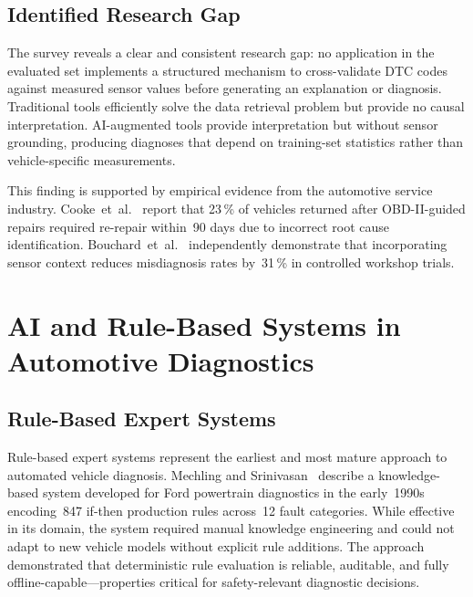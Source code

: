 \subsection{Identified Research Gap}

The survey reveals a clear and consistent research gap: no application in the evaluated set implements a structured mechanism to cross-validate DTC codes against measured sensor values before generating an explanation or diagnosis.
Traditional tools efficiently solve the data retrieval problem but provide no causal interpretation.
AI-augmented tools provide interpretation but without sensor grounding, producing diagnoses that depend on training-set statistics rather than vehicle-specific measurements.

This finding is supported by empirical evidence from the automotive service industry.
Cooke~et~al.~\cite{cooke2022} report that 23\,\% of vehicles returned after OBD-II-guided repairs required re-repair within~90 days due to incorrect root cause identification.
Bouchard~et~al.~\cite{bouchard2021} independently demonstrate that incorporating sensor context reduces misdiagnosis rates by~31\,\% in controlled workshop trials.


\section{AI and Rule-Based Systems in Automotive Diagnostics}
\label{sec:airulebased}

\subsection{Rule-Based Expert Systems}

Rule-based expert systems represent the earliest and most mature approach to automated vehicle diagnosis.
Mechling and Srinivasan~\cite{mechling1994} describe a knowledge-based system developed for Ford powertrain diagnostics in the early~1990s encoding~847 if-then production rules across~12 fault categories.
While effective in its domain, the system required manual knowledge engineering and could not adapt to new vehicle models without explicit rule additions.
The approach demonstrated that deterministic rule evaluation is reliable, auditable, and fully offline-capable---properties critical for safety-relevant diagnostic decisions.

